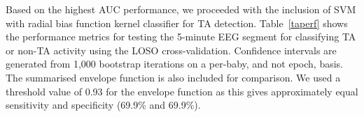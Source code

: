\documentclass[conference]{IEEEtran}
\begin{document}


Based on the highest AUC performance, we proceeded with the inclusion of SVM with radial bias function kernel classifier for TA detection.
Table~\ref{taperf} shows the performance metrics for testing the 5-minute EEG segment for classifying TA or non-TA activity using the LOSO cross-validation. 
Confidence intervals are generated from 1,000 bootstrap iterations on a per-baby, and not epoch, basis.
The summarised envelope function is also included for comparison. We used a threshold value of 0.93 for the envelope function as this gives approximately equal sensitivity and specificity (69.9\% and 69.9\%).
\end{document}
